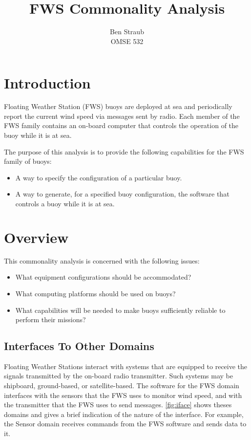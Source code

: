 \documentclass[letterpaper,11pt]{article}
\newcounter{type}
\newcounter{item}[type]
\begin{document}
\author{Ben Straub\\OMSE 532}
\title{FWS Commonality Analysis}
\maketitle

\section{Introduction}


Floating Weather Station (FWS) buoys are deployed at sea and periodically
report the current wind speed via messages sent by radio. Each member of the
FWS family contains an on-board computer that controls the operation of the
buoy while it is at sea.
 
The purpose of this analysis is to provide the following capabilities for the
FWS family of buoys:
 
\begin{itemize}
\item A way to specify the configuration of a particular buoy. 
\item A way to generate, for a specified buoy configuration, the software that
  controls a buoy while it is at sea.
\end{itemize}

\section{Overview}

This commonality analysis is concerned with the following issues:
 
\begin{itemize}
\item What equipment configurations should be accommodated?
\item What computing platforms should be used on buoys?
\item What capabilities will be needed to make buoys sufficiently reliable to
  perform their missions?
\end{itemize}
 
\subsection{Interfaces To Other Domains}

Floating Weather Stations interact with systems that are equipped to receive
the signals transmitted by the on-board radio transmitter. Such systems may be
shipboard, ground-based, or satellite-based. The software for the FWS domain
interfaces with the sensors that the FWS uses to monitor wind speed, and with
the transmitter that the FWS uses to send messages. \autoref{fig:iface} shows
theses domains and gives a brief indication of the nature of the
interface. For example, the Sensor domain receives commands from the FWS
software and sends data to it.
\end{document}
